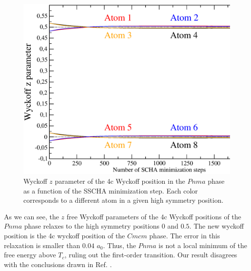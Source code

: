 \begin{figure}[h]
\begin{center}
\includegraphics[width=0.9\linewidth]{Figures/positions.eps}
\caption{Wyckoff $z$ parameter of the 4c Wyckoff position in the $Pnma$ phase as a function of the SSCHA 
minimization step. Each color corresponds to a different atom in a given high symmetry position.}
\label{atomic-relaxation}
\end{center}
\end{figure}
As we can see, the $z$ free Wyckoff parameters of the 4c Wyckoff positions of the $Pnma$ phase relaxes to the 
high symmetry positions $0$ and $0.5$. The new wyckoff position is the 4c wyckoff position of the $Cmcm$ 
phase. The error in this relaxation is smaller than $0.04$ $a_{0}$. Thus, the $Pnma$ is not a local minimum of the 
free energy above $T_{c}$, ruling out the first-order transition. Our result disagrees with the conclusions drawn in 
Ref. \cite{dewandre2016two}. \\


